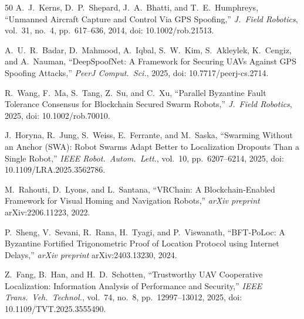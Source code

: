 \documentclass[conference,10pt]{IEEEtran}
\begin{document}
\begin{thebibliography}{50}
A.~J.~Kerns, D.~P.~Shepard, J.~A.~Bhatti, and T.~E.~Humphreys,
``Unmanned Aircraft Capture and Control Via {GPS} Spoofing,''
\emph{J.\ Field Robotics}, vol.~31, no.~4, pp.~617--636, 2014,
doi: 10.1002/rob.21513.

A.~U.~R.~Badar, D.~Mahmood, A.~Iqbal, S.~W.~Kim, S.~Akleylek, K.~Cengiz, and A.~Nauman,
``{DeepSpoofNet}: A Framework for Securing {UAV}s Against {GPS} Spoofing Attacks,''
\emph{PeerJ Comput.\ Sci.}, 2025,
doi: 10.7717/peerj-cs.2714.

R.~Wang, F.~Ma, S.~Tang, Z.~Su, and C.~Xu,
``Parallel Byzantine Fault Tolerance Consensus for Blockchain Secured Swarm Robots,''
\emph{J.\ Field Robotics}, 2025,
doi: 10.1002/rob.70010.

J.~Horyna, R.~Jung, S.~Weiss, E.~Ferrante, and M.~Saska,
``Swarming Without an Anchor ({SWA}): Robot Swarms Adapt Better to Localization Dropouts Than a Single Robot,''
\emph{IEEE Robot.\ Autom.\ Lett.}, vol.~10, pp.~6207--6214, 2025,
doi: 10.1109/LRA.2025.3562786.

M.~Rahouti, D.~Lyons, and L.~Santana,
``{VRChain}: A Blockchain-Enabled Framework for Visual Homing and Navigation Robots,''
\emph{arXiv preprint} arXiv:2206.11223, 2022.

P.~Sheng, V.~Sevani, R.~Rana, H.~Tyagi, and P.~Viswanath,
``{BFT-PoLoc}: A {Byzantine} Fortified Trigonometric Proof of Location Protocol using {Internet} Delays,''
\emph{arXiv preprint} arXiv:2403.13230, 2024.

Z.~Fang, B.~Han, and H.~D.~Schotten,
``Trustworthy {UAV} Cooperative Localization: Information Analysis of Performance and Security,''
\emph{IEEE Trans.\ Veh.\ Technol.}, vol.~74, no.~8, pp.~12997--13012, 2025,
doi: 10.1109/TVT.2025.3555490.

\end{thebibliography}
\end{document}
